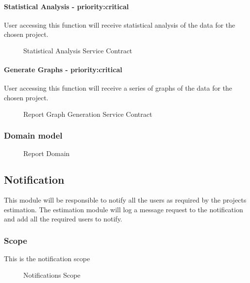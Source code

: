 	\paragraph{Statistical Analysis - priority:critical}
	User accessing this function will receive statistical analysis of the data for the chosen project.
	\begin{figure}[H]
	    	\centering
	    	\caption{Statistical Analysis Service Contract}
	    	\label{fig:Report_getStatistics.png Contract}
   	\end{figure}
	\paragraph{Generate Graphs - priority:critical}
	User accessing this function will receive a series of graphs of the data for the chosen project. 
	\begin{figure}[H]
	    	\centering
	    	\caption{Report Graph Generation Service Contract}
	    	\label{fig:Report_GraphGeneration.png Contract}
   	\end{figure}

\subsubsection{Domain model}
	\begin{figure}[H]
	    	\centering
	    	\caption{Report Domain}
	    	\label{fig:Report_Domain.png}
   	\end{figure}
\subsection{Notification}
This module will be responsible to notify all the users as required by the projects estimation. The estimation module will log a message request to the notification and add all the required users to notify.
\subsubsection{Scope}
This is the notification scope
	\begin{figure}[H]
	    	\centering
	    	\caption{Notifications Scope}
	    	\label{fig:Notification_Scope}
   	\end{figure}
